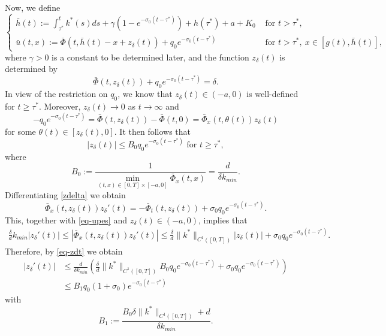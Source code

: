 \documentclass[11pt]{amsart}
\numberwithin{equation}{section}
\begin{document}
Now, we define
\begin{equation}\label{eq-ups}
  \begin{cases}
    \displaystyle\bar{h}(t):=\int_{\tau^*}^{t}k^*(s)ds+\gamma(1-e^{-\sigma_0(t-\tau^{*})})+h(\tau^*)+a+K_0 &\text{ for } t>\tau^*,\\[2mm]
    \bar{u}(t,x):=\bar{\Phi}(t, \bar{h}(t)-x+z_\delta(t))+ q_0e^{-\sigma_0(t-\tau^{*})}&\text{ for }t>\tau^*,\ x\in[g(t),\bar{h}(t)],
  \end{cases}
\end{equation}
where   $\gamma>0$ is a  constant to be determined later, and  the function $z_\delta(t)$ is determined by  
\begin{equation}\label{zdelta}
\bar{\Phi}(t,z_\delta(t))+q_0e^{-\sigma_0(t-\tau^{*})}=\delta.
\end{equation}
In view of the restriction on $q_0$, we know that  $z_\delta(t)\in(-a,0)$ is well-defined  for $t\geq\tau^*$. Moreover, $z_\delta(t)\to 0$ as $t\to\infty$ and 
\begin{equation}
  -q_0e^{-\sigma_0(t-\tau^{*})}=\bar{\Phi}(t,z_\delta(t))-\bar{\Phi}(t,0)= \bar{\Phi}_x(t,\theta(t))z_\delta(t)
\end{equation}
for some  $\theta(t)\in[z_\delta(t),0]$. It then  follows that  
\begin{equation}\label{eq-zdt}
  |z_\delta(t)|\leq B_0q_0e^{-\sigma_0(t-\tau^*)}\text{ for } t\geq \tau^*, 
\end{equation}
where 
\begin{equation*}
  B_0:=\frac{1 }{\min_{(t,x)\in[0,T]\times[-a,0]}\bar{\Phi}_x(t,x)}=\frac{d }{\delta k_{min}}.
\end{equation*}
Differentiating \eqref{zdelta} we obtain
\begin{equation*}
  \bar{\Phi}_x(t,z_\delta(t))z_\delta'(t)= -\bar{\Phi}_t(t,z_\delta(t))+ \sigma_0q_0 e^{-\sigma_0(t-\tau^*)}.
  \end{equation*}
This, together with \eqref{eq-upes} and  $z_\delta(t)\in(-a,0)$, implies that 
\begin{eqnarray*}
  \frac{\delta}{d} k_{min}|z_\delta'(t)|\leq|\bar{\Phi}_x(t,z_\delta(t)) z_\delta'(t)|\leq \frac{\delta}{d}\|k^*\|_{C^1([0,T])}|z_\delta(t)|+ \sigma_0q_0 e^{-\sigma_0(t-\tau^*)}.
\end{eqnarray*}
Therefore, by  \eqref{eq-zdt} we obtain
\begin{equation}\label{eq-zd'}
\begin{aligned}
  |z_\delta'(t)|&\leq  \frac{d}{\delta  k_{min}}\left( \frac{\delta}{d}\|k^*\|_{C^1([0,T])}B_0q_0e^{-\sigma_0(t-\tau^*)}+ \sigma_0q_0 e^{-\sigma_0(t-\tau^*)}\right)\\
  &\leq   B_1q_0(1+\sigma_0)e^{-\sigma_0(t-\tau^*)}
  \end{aligned}
\end{equation}
with  
\begin{equation*}
  B_1:=\frac{B_0\delta \|k^*\|_{C^1([0,T])}+d}{ \delta k_{min}}.
\end{equation*}
\end{document}
